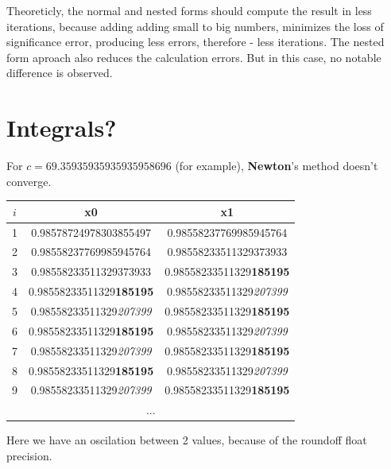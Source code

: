 \documentclass{article}
\begin{document}
			\par Theoreticly, the normal and nested forms should compute the result in less iterations, because adding adding small to big numbers, minimizes the loss of significance error, producing less errors, therefore - less iterations. The nested form aproach also reduces the calculation errors. But in this case, no notable difference is observed.

			\newpage
			\section{Integrals?}
				\begin{center}
					For $c = 69.35935935935935958696$ (for example), \textbf{Newton}'s method doesn't converge.\\
					\begin{tabular}{|c|c|c|}
						\hline
						$i$ & x0 & x1\\
						\hline
						1 & 0.98578724978303855497 & 0.98558237769985945764\\
						\hline
						2 & 0.98558237769985945764 & 0.98558233511329373933\\
						\hline
						3 & 0.98558233511329373933 & 0.98558233511329\textbf{185195}\\
						\hline
						4 & 0.98558233511329\textbf{185195} & 0.98558233511329\textit{207399}\\
						\hline
						5 & 0.98558233511329\textit{207399} & 0.98558233511329\textbf{185195}\\
						\hline
						6 & 0.98558233511329\textbf{185195} & 0.98558233511329\textit{207399}\\
						\hline
						7 & 0.98558233511329\textit{207399} & 0.98558233511329\textbf{185195}\\
						\hline
						8 & 0.98558233511329\textbf{185195} & 0.98558233511329\textit{207399}\\
						\hline
						9 & 0.98558233511329\textit{207399} & 0.98558233511329\textbf{185195}\\
						\multicolumn{3}{c}{...}
					\end{tabular}
				\end{center}
				\par Here we have an oscilation between 2 values, because of the roundoff float precision.
\end{document}
